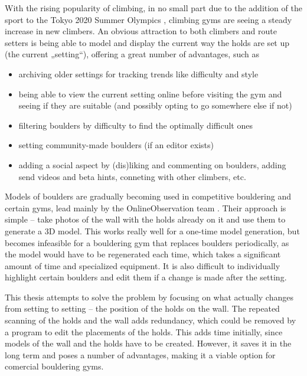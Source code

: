 

With the rising popularity of climbing, in no small part due to the addition of the sport to the Tokyo 2020 Summer Olympics \cite{olympics}, climbing gyms are seeing a steady increase in new climbers.
An obvious attraction to both climbers and route setters is being able to model and display the current way the holds are set up (the current „setting“), offering a great number of advantages, such as

\begin{itemize}
	\item archiving older settings for tracking trends like difficulty and style
	\item being able to view the current setting online before visiting the gym and seeing if they are suitable (and possibly opting to go somewhere else if not)
	\item filtering boulders by difficulty to find the optimally difficult ones
	\item setting community-made boulders (if an editor exists)
	\item adding a social aspect by (dis)liking and commenting on boulders, adding send videos and beta hints, conneting with other climbers, etc.
\end{itemize}

Models of boulders are gradually becoming used in competitive bouldering and certain gyms, lead mainly by the OnlineObservation team \cite{onlineobservation}.
Their approach is simple -- take photos of the wall with the holds already on it and use them to generate a 3D model.
This works really well for a one-time model generation, but becomes infeasible for a bouldering gym that replaces boulders periodically, as the model would have to be regenerated each time, which takes a significant amount of time and specialized equipment.
It is also difficult to individually highlight certain boulders and edit them if a change is made after the setting.

This thesis attempts to solve the problem by focusing on what actually changes from setting to setting -- the position of the holds on the wall.
The repeated scanning of the holds and the wall adds redundancy, which could be removed by a program to edit the placements of the holds.
This adds time initially, since models of the wall and the holds have to be created.
However, it saves it in the long term and poses a number of advantages, making it a viable option for comercial bouldering gyms.



